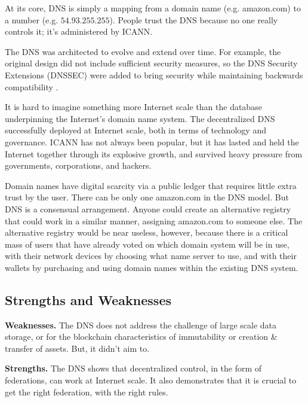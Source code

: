 At its core, DNS is simply a mapping from a domain name (e.g. amazon.com) to a number (e.g. $54.93.255.255$).
People trust the DNS because no one really controls it; it’s administered by ICANN.

The DNS was architected to evolve and extend over time.
For example, the original design did not include sufficient security measures, so the DNS Security Extensions (DNSSEC) were added to bring security while maintaining backwards compatibility \cite{icann2014dnssec}.

It is hard to imagine something more Internet scale than the database underpinning the Internet’s domain name system.
The decentralized DNS successfully deployed at Internet scale, both in terms of technology and governance.
ICANN has not always been popular, but it has lasted and held the Internet together through its explosive growth, and survived heavy pressure from governments, corporations, and hackers.

Domain names have digital scarcity via a public ledger that requires little extra trust by the user.
There can be only one amazon.com in the DNS model. But DNS is a consensual arrangement.
Anyone could create an alternative registry that could work in a similar manner, assigning amazon.com to someone else.
The alternative registry would be near useless, however, because there is a critical mass of users that have already voted on which domain system will be in use, with their network devices by choosing what name server to use, and with their wallets by purchasing and using domain names within the existing DNS system.

\subsection{Strengths and Weaknesses}
\medskip
\noindent\textbf{Weaknesses.} The DNS does not address the challenge of large scale data storage, or for the blockchain characteristics of immutability or creation \& transfer of assets.
But, it didn’t aim to.

\medskip
\noindent\textbf{Strengths.} The DNS shows that decentralized control, in the form of federations, can work at Internet scale.
It also demonstrates that it is crucial to get the right federation, with the right rules.
